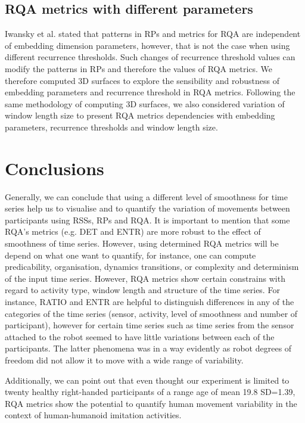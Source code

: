 \documentclass[fleqn,10pt]{wlscirep}
\begin{document}
\subsection*{RQA metrics with different parameters}
Iwansky et al. \cite{iwanski1998} stated that patterns in RPs and 
metrics for RQA are independent of embedding dimension parameters, 
however, that is not the case when using 
different recurrence thresholds. Such changes of recurrence threshold values 
can modify the patterns in RPs and therefore the values of RQA metrics.
We therefore computed 3D surfaces to explore the sensibility and robustness of 
embedding parameters and recurrence threshold in RQA  metrics. Following the 
same methodology of computing 3D surfaces, we also considered variation of 
window length size to present RQA metrics dependencies with embedding 
parameters, recurrence thresholds and window length size.



\section*{Conclusions}
Generally, we can conclude that using a different level of 
smoothness for time series help us to visualise and to quantify 
the variation of movements 
between participants using RSSs, RPs and RQA. 
It is important to mention that some RQA's metrics 
(e.g. DET and ENTR) are more robust to the effect of 
smoothness of time series.
However, using determined RQA metrics will be depend on 
what one want to quantify, for instance, one can compute 
predicability, organisation,  
dynamics transitions, or complexity and determinism of the 
input time series. However, RQA metrics show certain constrains with 
regard to activity type, window length and structure of the time series.
For instance, RATIO and ENTR are helpful to distinguish 
differences in any of the categories of the time series (sensor, activity, 
level of smoothness and number of participant), however for certain time series
such as time series from the sensor attached to the robot seemed to have 
little variations between each of the participants. 
The latter phenomena was in a way evidently as robot degrees of freedom 
did not allow it to move with a wide range of variability. 

Additionally, we can point out that even thought our experiment is 
limited to twenty healthy right-handed participants of a range age 
of mean 19.8 SD=1.39, RQA metrics show the potential to quantify 
human movement variability in the context of 
human-humanoid imitation activities.
\end{document}
